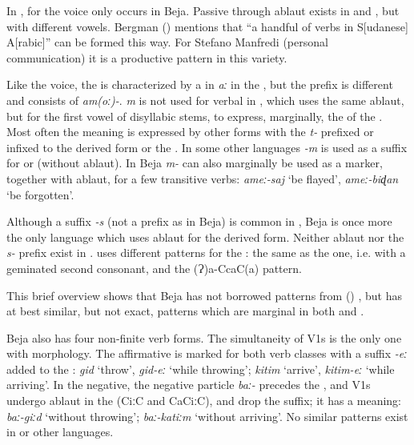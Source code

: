 \documentclass[output=paper]{langsci/langscibook}
\begin{document}
In ,  for the  voice only occurs in Beja. Passive  through ablaut exists in  and  , but with different vowels. Bergman (\citeyear[34]{Bergman2002}) mentions that “a handful of verbs in S[udanese] A[rabic]” can be formed this way. For Stefano Manfredi (personal communication) it is a productive pattern in this  variety.

Like the  voice, the  is characterized by a  in \textit{aː} in the , but the prefix is different and consists of \textit{am(oː)-}. \textit{m} is not used for verbal  in , which uses the same ablaut, but for the first vowel of disyllabic stems, to express, marginally, the  of the . Most often the  meaning is expressed by other forms with the \textit{t-} prefixed or infixed to the derived form or the . In some other  languages \textit{\nobreakdash-m} is used as a suffix for  or  (without ablaut). In Beja \textit{m-} can also marginally be used as a  marker, together with ablaut, for a few transitive  verbs: \textit{ameː\nobreakdash-saj} ‘be flayed’, \textit{ameː\nobreakdash-biɖan} ‘be forgotten’.

Although a suffix \textit{{}-s} (not a prefix as in Beja) is common in , Beja is once more the only  language which uses ablaut for the  derived form. Neither ablaut nor the \textit{s-} prefix exist in .  uses different patterns for the : the same as the  one, i.e. with a geminated second  consonant, and the (Ɂ)a-CcaC(a) pattern.

This brief overview shows that Beja has not borrowed patterns from () , but has at best similar, but not exact,  patterns which are marginal in both  and  .

Beja also has four non-finite verb forms. The simultaneity  of V1s is the only one with  morphology. The affirmative  is marked for both verb classes with a suffix \textit{{}-eː} added to the : \textit{gid} ‘throw’, \textit{gid\nobreakdash-eː} ‘while throwing’; \textit{kitim} ‘arrive’, \textit{kitim-eː} ‘while arriving’. In the negative, the negative particle \textit{baː-} precedes the , and V1s undergo ablaut in the  (CiːC and CaCiːC), and drop the suffix; it has a  meaning: \textit{baː-giːd} ‘without throwing’; \textit{baː-katiːm} ‘without arriving’. No similar patterns exist in  or other  languages.
\end{document}
